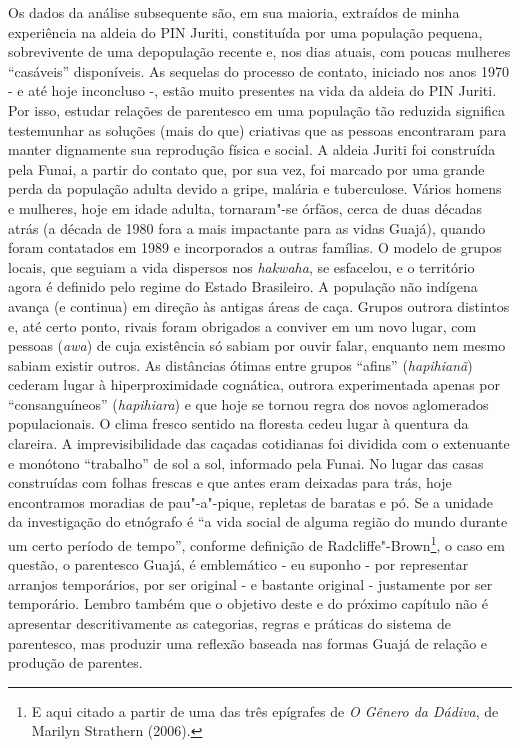 Os dados da análise subsequente são, em sua maioria, extraídos de minha
experiência na aldeia do PIN Juriti, constituída por uma população
pequena, sobrevivente de uma depopulação recente e, nos dias atuais, com
poucas mulheres ``casáveis'' disponíveis. As sequelas do processo de
contato, iniciado nos anos 1970 - e até hoje inconcluso -, estão muito
presentes na vida da aldeia do PIN Juriti. Por isso, estudar relações de
parentesco em uma população tão reduzida significa testemunhar as
soluções (mais do que) criativas que as pessoas encontraram para manter
dignamente sua reprodução física e social. A aldeia Juriti foi
construída pela Funai, a partir do contato que, por sua vez, foi marcado
por uma grande perda da população adulta devido a gripe, malária e
tuberculose. Vários homens e mulheres, hoje em idade adulta, tornaram"-se
órfãos, cerca de duas décadas atrás (a década de 1980 fora a mais
impactante para as vidas Guajá), quando foram contatados em 1989 e
incorporados a outras famílias. O modelo de grupos locais, que seguiam a
vida dispersos nos \emph{hakwaha}, se esfacelou, e o território agora é
definido pelo regime do Estado Brasileiro. A população não indígena
avança (e continua) em direção às antigas áreas de caça. Grupos outrora
distintos e, até certo ponto, rivais foram obrigados a conviver em um
novo lugar, com pessoas (\emph{awa}) de cuja existência só sabiam por
ouvir falar, enquanto nem mesmo sabiam existir outros. As distâncias
ótimas entre grupos ``afins'' (\emph{hapihianã}) cederam lugar à
hiperproximidade cognática, outrora experimentada apenas por
``consanguíneos'' (\emph{hapihiara}) e que hoje se tornou regra dos novos
aglomerados populacionais. O clima fresco sentido na floresta cedeu
lugar à quentura da clareira. A imprevisibilidade das caçadas cotidianas
foi dividida com o extenuante e monótono ``trabalho'' de sol a sol,
informado pela Funai. No lugar das casas construídas com folhas frescas
e que antes eram deixadas para trás, hoje encontramos moradias de
pau"-a"-pique, repletas de baratas e pó. Se a unidade da investigação do
etnógrafo é ``a vida social de alguma região do mundo durante um certo
período de tempo'', conforme definição de Radcliffe"-Brown\footnote{E aqui
  citado a partir de uma das três epígrafes de \emph{O Gênero da
  Dádiva}, de Marilyn Strathern (2006).}, o caso em questão, o
parentesco Guajá, é emblemático - eu suponho - por representar arranjos
temporários, por ser original - e bastante original - justamente por ser
temporário. Lembro também que o objetivo deste e do próximo capítulo não
é apresentar descritivamente as categorias, regras e práticas do sistema
de parentesco, mas produzir uma reflexão baseada nas formas Guajá de
relação e produção de parentes.

